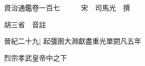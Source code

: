 






























































資治通鑑卷一百七　　　宋　司馬光　撰

胡三省　音註

晉紀二十九|{
	起彊圉大淵獻盡重光單閼凡五年}


烈宗孝武皇帝中之下

